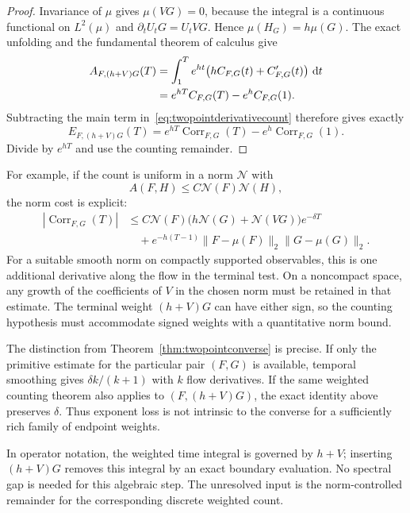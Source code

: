 \begin{proof}
Invariance of $\mu$ gives $\mu(VG)=0$, because the integral is a
continuous functional on $L^2(\mu)$ and
$\partial_tU_tG=U_tVG$. Hence $\mu(H_G)=h\mu(G)$.
The exact unfolding and the fundamental theorem of calculus give
\begin{align}
 A_{F,(h+V)G}(T)
  &=\int_1^T e^{ht}
       \bigl(hC_{F,G}(t)+C_{F,G}'(t)\bigr)\,\mathop{}\!\mathrm d t\notag\\
  &=e^{hT}C_{F,G}(T)-e^h C_{F,G}(1).
 \label{eq:twopointfundamental}
\end{align}
Subtracting the main term in~\eqref{eq:twopointderivativecount}
therefore gives exactly
\begin{equation}
 E_{F,(h+V)G}(T)
  =e^{hT}\operatorname{Corr}_{F,G}(T)
       -e^h\operatorname{Corr}_{F,G}(1).
 \label{eq:twopointfullidentity}
\end{equation}
Divide by $e^{hT}$ and use the counting remainder.
\end{proof}

For example, if the count is uniform in a norm $\mathcal N$ with
\[
 A(F,H)\leq C\mathcal N(F)\mathcal N(H),
\]
the norm cost is explicit:
\begin{equation}
 \begin{split}
 |\operatorname{Corr}_{F,G}(T)|
 &\leq C\mathcal N(F)
       \bigl(h\mathcal N(G)+\mathcal N(VG)\bigr)e^{-\delta T}\\
 &\quad+e^{-h(T-1)}
       \|F-\mu(F)\|_2\|G-\mu(G)\|_2.
 \end{split}
 \label{eq:twopointfullnorm}
\end{equation}
For a suitable smooth norm on compactly supported observables,
this is one additional derivative along the flow in the terminal
test. On a noncompact space, any growth of the coefficients of
$V$ in the chosen norm must be retained in that estimate.
The terminal weight $(h+V)G$ can have either sign, so the counting
hypothesis must accommodate signed weights with a quantitative
norm bound.

The distinction from Theorem~\ref{thm:twopointconverse} is precise.
If only the primitive estimate for the particular pair $(F,G)$ is
available, temporal smoothing gives $\delta k/(k+1)$ with $k$
flow derivatives. If the same weighted counting theorem also
applies to $(F,(h+V)G)$, the exact identity above preserves
$\delta$. Thus exponent loss is not intrinsic to the converse
for a sufficiently rich family of endpoint weights.

In operator notation, the weighted time integral is governed by
$h+V$; inserting $(h+V)G$ removes this integral by an exact
boundary evaluation. No spectral gap is needed for this
algebraic step. The unresolved input is the norm-controlled
remainder for the corresponding discrete weighted count.

